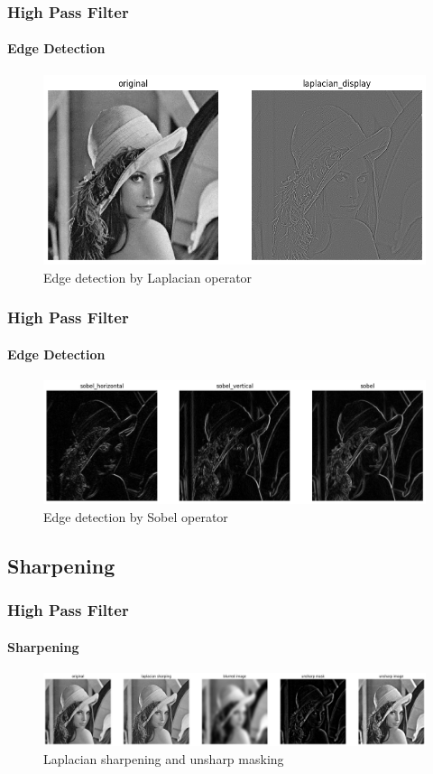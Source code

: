 \documentclass[
	11pt, %
	aspectratio=169, %
]{beamer}
\begin{document}
		\begin{frame}
			\frametitle{High Pass Filter}
			\framesubtitle{Edge Detection}

			\begin{figure}[htbp]
				\centering
				 \includegraphics[width = 0.8\linewidth]{edge_detec_1.png}
				 \caption{Edge detection by Laplacian operator}
				\label{fig:laplacian}
			\end{figure}
		\end{frame}

		\begin{frame}
			\frametitle{High Pass Filter}
			\framesubtitle{Edge Detection}

			\begin{figure}[htbp]
				\includegraphics[width = \linewidth]{edge_detec_2.png}
				\caption{Edge detection by Sobel operator}
			\end{figure}
		\end{frame}

	\subsection{Sharpening}

		\begin{frame}
			\frametitle{High Pass Filter}
			\framesubtitle{Sharpening}

			\begin{figure}[H]
				\includegraphics[width = \linewidth]{sharp_1.png}
				\caption{Laplacian sharpening and unsharp masking}
			\end{figure}
		\end{frame}
		
\end{document}
